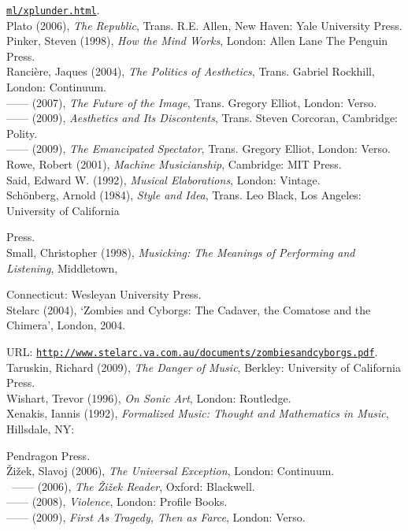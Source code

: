 \href{http://www.plunderphonics.com/xhtml/xplunder.html}{\texttt{ml/xplunder.html}}.
\hypertarget{plato}{}\\
Plato (2006), \emph{The Republic}, Trans. R.E. Allen, New Haven: Yale University Press. 
\hypertarget{pinker}{}\\
Pinker, Steven (1998), \emph{How the Mind Works}, London: Allen Lane The Penguin Press. 
\hypertarget{ranpoli}{}\\
Ranci\`{e}re, Jaques (2004), \emph{The Politics of Aesthetics}, Trans. Gabriel Rockhill, London: Continuum. 
\hypertarget{ranimg}{}\\
------ (2007), \emph{The Future of the Image}, Trans. Gregory Elliot, London: Verso. 
\hypertarget{ranaesth}{}\\
------ (2009), \emph{Aesthetics and Its Discontents}, Trans. Steven Corcoran, Cambridge: Polity. 
\hypertarget{ranspec}{}\\
------ (2009), \emph{The Emancipated Spectator}, Trans. Gregory Elliot, London: Verso.
\hypertarget{rowe}{}\\
Rowe, Robert (2001), \emph{Machine Musicianship}, Cambridge: MIT Press. 
\hypertarget{said}{}\\
Said, Edward W. (1992), \emph{Musical Elaborations}, London: Vintage. 
\hypertarget{schoen}{}\\
Sch\"{o}nberg, Arnold (1984),  \emph{Style and Idea}, Trans. Leo Black, Los Angeles: University of California

Press. 
\hypertarget{small}{}\\
Small, Christopher (1998), \emph{Musicking: The Meanings of Performing and Listening}, Middletown, 

Connecticut: Wesleyan University Press. 
\hypertarget{stelarc}{}\\
Stelarc (2004), `Zombies and Cyborgs: The Cadaver, the Comatose and the Chimera', London, 2004.

URL: \href{http://www.stelarc.va.com.au/documents/zombiesandcyborgs.pdf}{\texttt{http://www.stelarc.va.com.au/documents/zombiesandcyborgs.pdf}}.
\hypertarget{taruskin}{}\\
Taruskin, Richard (2009), \emph{The Danger of Music}, Berkley: University of California Press. 
\hypertarget{wishart}{}\\
Wishart, Trevor (1996), \emph{On Sonic Art}, London: Routledge. 
\hypertarget{xenakis}{}\\
Xenakis, Iannis (1992), \emph{Formalized Music: Thought and Mathematics in Music}, Hillsdale, NY: 

Pendragon Press. 
\hypertarget{zizekuniv}{}\\
\v{Z}i\v{z}ek, Slavoj (2006), \emph{The Universal Exception}, London: Continuum. 
\hypertarget{zizekreader}{}\\\
------ (2006), \emph{The \v{Z}i\v{z}ek Reader}, Oxford: Blackwell.\\
------ (2008), \emph{Violence}, London: Profile Books. 
\hypertarget{zizektragedy}{}\\
------ (2009), \emph{First As Tragedy, Then as Farce}, London: Verso.\\
